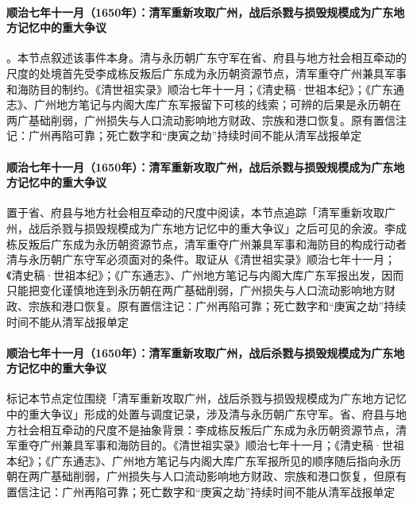 \paragraph{顺治七年十一月（1650年）：清军重新攻取广州，战后杀戮与损毁规模成为广东地方记忆中的重大争议}
。本节点叙述该事件本身。清与永历朝广东守军在省、府县与地方社会相互牵动的尺度的处境首先受李成栋反叛后广东成为永历朝资源节点，清军重夺广州兼具军事和海防目的制约。《清世祖实录》顺治七年十一月；《清史稿·世祖本纪》；《广东通志》、广州地方笔记与内阁大库广东军报留下可核的线索；可辨的后果是永历朝在两广基础削弱，广州损失与人口流动影响地方财政、宗族和港口恢复。原有置信注记：广州再陷可靠；死亡数字和“庚寅之劫”持续时间不能从清军战报单定

\paragraph{顺治七年十一月（1650年）：清军重新攻取广州，战后杀戮与损毁规模成为广东地方记忆中的重大争议}
 置于省、府县与地方社会相互牵动的尺度中阅读，本节点追踪「清军重新攻取广州，战后杀戮与损毁规模成为广东地方记忆中的重大争议」之后可见的余波。李成栋反叛后广东成为永历朝资源节点，清军重夺广州兼具军事和海防目的构成行动者清与永历朝广东守军必须面对的条件。取证从《清世祖实录》顺治七年十一月；《清史稿·世祖本纪》；《广东通志》、广州地方笔记与内阁大库广东军报出发，因而只能把变化谨慎地连到永历朝在两广基础削弱，广州损失与人口流动影响地方财政、宗族和港口恢复。原有置信注记：广州再陷可靠；死亡数字和“庚寅之劫”持续时间不能从清军战报单定

\paragraph{顺治七年十一月（1650年）：清军重新攻取广州，战后杀戮与损毁规模成为广东地方记忆中的重大争议}
 标记本节点定位围绕「清军重新攻取广州，战后杀戮与损毁规模成为广东地方记忆中的重大争议」形成的处置与调度记录，涉及清与永历朝广东守军。省、府县与地方社会相互牵动的尺度不是抽象背景：李成栋反叛后广东成为永历朝资源节点，清军重夺广州兼具军事和海防目的。《清世祖实录》顺治七年十一月；《清史稿·世祖本纪》；《广东通志》、广州地方笔记与内阁大库广东军报所见的顺序随后指向永历朝在两广基础削弱，广州损失与人口流动影响地方财政、宗族和港口恢复，但原有置信注记：广州再陷可靠；死亡数字和“庚寅之劫”持续时间不能从清军战报单定

